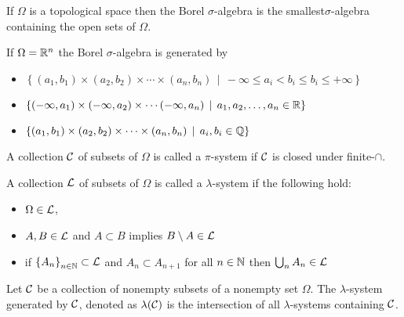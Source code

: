 \begin{definition}
    If $\Omega$ is a topological space then the Borel $\sigma$-algebra is the smallest$\sigma$-algebra containing the open sets of $\Omega$.
    \label{def:borel-sigma-algebra}
\end{definition}

\begin{fact}
    If $\Omega = \mathbb R ^n$ the Borel $\sigma$-algebra is generated by
    \begin{itemize}
	\item $\left\{ \left( a_1 , b_1 \right) \times \left( a_2 , b_2 \right) \times\cdots \times \left( a_n , b_n \right) \, \mid \, -\infty \le a_i < b_i \le b_i \le +\infty  \right\} $
	\item $\left\{ \left( -\infty , a_1 \right) \times \left( -\infty , a_2 \right) \times \cdots \left( -\infty , a_n \right) \, \mid \, a_1 ,a_2, \ldots , a_n \in \mathbb R \right\}$
	\item $\left\{ \left( a_1 , b_1 \right)\times \left( a_2 , b_2 \right) \times \cdots \times \left( a_n , b_n \right) \, \mid \, a_i , b_i \in \mathbb Q \right\}$
    \end{itemize}
\end{fact}

\begin{definition}
    A collection ${\cal C}$ of subsets of $\Omega$ is called a $\pi$-system if ${\cal C}$ is closed under finite-$\cap$.

    A collection ${\cal L}$ of subsets of $\Omega$ is called a $\lambda$-system if the following hold:
    \begin{itemize}
	\item $\Omega \in {\cal L}$,
	\item $A,B\in {\cal L}$ and $A\subset B$ implies $B\setminus A \in {\cal L}$
	\item if $\left\{ A_n \right\}_{n\in\mathbb N} \subset {\cal L}$ and $A_n \subset A_{n+1}$ for all $n\in \mathbb N$ then $\bigcup_{n} A_n \in {\cal L}$
    \end{itemize}
    \label{def:pi-lambda}
\end{definition}

\begin{definition}
    Let ${\cal C}$ be a collection of nonempty subsets of a nonempty set $\Omega$. The $\lambda$-system generated by ${\cal C}$, denoted as $\lambda ({\cal C} )$ is the intersection of all $\lambda$-systems containing ${\cal C}$.
    \label{def:generated-lambda-system}
\end{definition}


